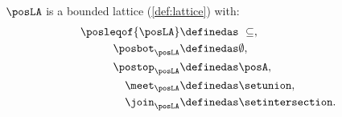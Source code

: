 \begin{lemma}
    $\posLA$ is a bounded lattice (\cref{def:lattice}) with:
    \begin{equation}
        \begin{aligned}
            \posleqof{\posLA} & \definedas \ \subseteq,      \\
            \posbot_{\posLA}  & \definedas \emptyset,        \\
            \postop_{\posLA}  & \definedas \posA,            \\
            \meet_{\posLA}    & \definedas \setunion,        \\
            \join_{\posLA}    & \definedas \setintersection.
        \end{aligned}
    \end{equation}
\end{lemma}
